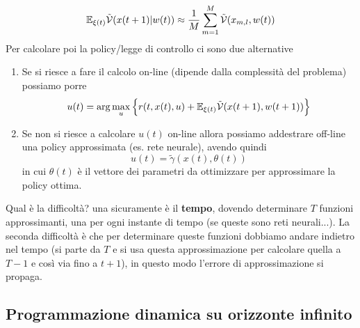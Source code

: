 \begin{equation}
\mathbb{E}_{\xi(t)} \tilde{\mathcal{V}}(x(t+1)|w(t)) \approx \frac{1}{M} \sum_{m=1}^M \tilde{\mathcal{V}} (x_{m,l},w(t))
\end{equation} Per calcolare poi la policy/legge di controllo ci sono due alternative
\begin{enumerate}
\item Se si riesce a fare il calcolo on-line (dipende dalla complessit\`a del problema) possiamo porre
    \begin{equation}
    u(t) = \arg \max_u \Big \{ r(t, x(t), u) + \mathbb{E}_{\xi(t)} \tilde{\mathcal{V}}(x(t+1), w(t+1)) \Big \}
    \end{equation}
\item Se non si riesce a calcolare $u(t)$ on-line allora possiamo addestrare off-line una policy approssimata (es. rete neurale), avendo quindi
    \begin{equation}
    u(t) = \tilde{\gamma}(x(t), \theta(t))
    \end{equation} in cui $\theta(t)$ \`e il vettore dei parametri da ottimizzare per approssimare la policy ottima.
\end{enumerate}
Qual \`e la difficolt\`a? una sicuramente \`e il \textbf{tempo}, dovendo determinare $T$ funzioni approssimanti, una per ogni instante di tempo (se queste sono reti neurali...). La seconda difficolt\`a \`e che per determinare queste funzioni dobbiamo andare indietro nel tempo (si parte da $T$ e si usa questa approssimazione per calcolare quella a $T-1$ e cos\`i via fino a $t+1$), in questo modo l'errore di approssimazione si propaga.

\subsection{Programmazione dinamica su orizzonte infinito}

